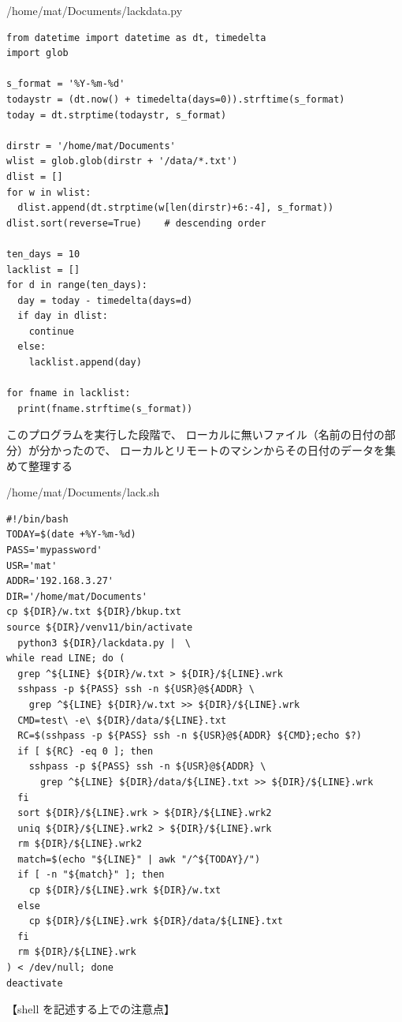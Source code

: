 \documentclass[12pt,a4paper,uplatex]{jsarticle}
\begin{document}
\begin{itembox}[l]{/home/mat/Documents/lackdata.py}
	\begin{verbatim}
from datetime import datetime as dt, timedelta
import glob

s_format = '%Y-%m-%d'
todaystr = (dt.now() + timedelta(days=0)).strftime(s_format)
today = dt.strptime(todaystr, s_format)

dirstr = '/home/mat/Documents'
wlist = glob.glob(dirstr + '/data/*.txt')
dlist = []
for w in wlist:
  dlist.append(dt.strptime(w[len(dirstr)+6:-4], s_format))
dlist.sort(reverse=True)	# descending order

ten_days = 10
lacklist = []
for d in range(ten_days):
  day = today - timedelta(days=d)
  if day in dlist:
    continue
  else:
    lacklist.append(day)

for fname in lacklist:
  print(fname.strftime(s_format))
	\end{verbatim}
\end{itembox}

このプログラムを実行した段階で、
ローカルに無いファイル（名前の日付の部分）が分かったので、
ローカルとリモートのマシンからその日付のデータを集めて整理する
\begin{itembox}[l]{/home/mat/Documents/lack.sh}
	\begin{verbatim}
#!/bin/bash
TODAY=$(date +%Y-%m-%d)
PASS='mypassword'
USR='mat'
ADDR='192.168.3.27'
DIR='/home/mat/Documents'
cp ${DIR}/w.txt ${DIR}/bkup.txt
source ${DIR}/venv11/bin/activate
  python3 ${DIR}/lackdata.py |　\
while read LINE; do (
  grep ^${LINE} ${DIR}/w.txt > ${DIR}/${LINE}.wrk
  sshpass -p ${PASS} ssh -n ${USR}@${ADDR} \
    grep ^${LINE} ${DIR}/w.txt >> ${DIR}/${LINE}.wrk
  CMD=test\ -e\ ${DIR}/data/${LINE}.txt
  RC=$(sshpass -p ${PASS} ssh -n ${USR}@${ADDR} ${CMD};echo $?)
  if [ ${RC} -eq 0 ]; then
    sshpass -p ${PASS} ssh -n ${USR}@${ADDR} \
      grep ^${LINE} ${DIR}/data/${LINE}.txt >> ${DIR}/${LINE}.wrk
  fi
  sort ${DIR}/${LINE}.wrk > ${DIR}/${LINE}.wrk2
  uniq ${DIR}/${LINE}.wrk2 > ${DIR}/${LINE}.wrk
  rm ${DIR}/${LINE}.wrk2
  match=$(echo "${LINE}" | awk "/^${TODAY}/")
  if [ -n "${match}" ]; then
    cp ${DIR}/${LINE}.wrk ${DIR}/w.txt
  else
    cp ${DIR}/${LINE}.wrk ${DIR}/data/${LINE}.txt
  fi
  rm ${DIR}/${LINE}.wrk
) < /dev/null; done
deactivate
	\end{verbatim}
\end{itembox}

【shell を記述する上での注意点】
\end{document}
